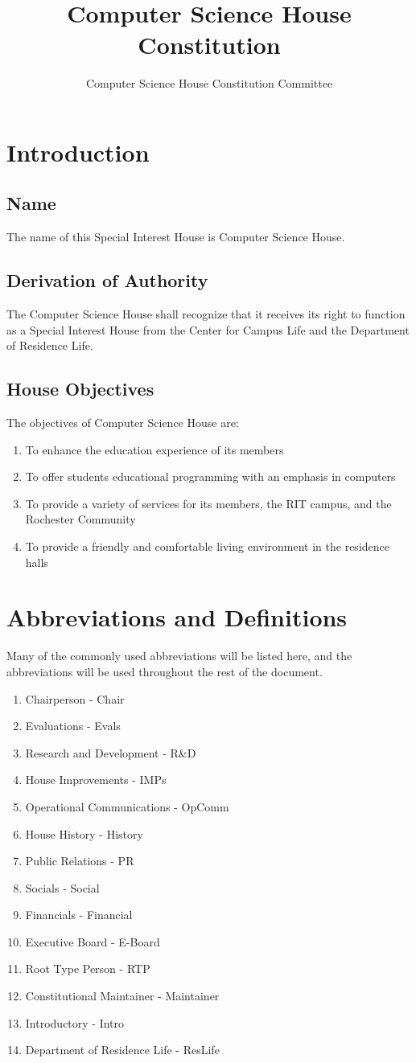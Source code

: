 \documentclass{article}
\title{Computer Science House Constitution}
\author{Computer Science House Constitution Committee}
\date{\datechanged}
\newcommand{\article}[1]{\section{#1} \label{#1}}
\newcommand{\asection}[1]{\subsection{#1} \label{#1}}
\begin{document}
\maketitle

\tableofcontents

\article{Introduction}

\asection{Name}
The name of this Special Interest House is Computer Science House.

\asection{Derivation of Authority}
The Computer Science House shall recognize that it receives its right to function as a Special Interest House from the Center for Campus Life and the Department of Residence Life.

\asection{House Objectives}
The objectives of Computer Science House are:
\begin{enumerate}
	\item To enhance the education experience of its members
	\item To offer students educational programming with an emphasis in computers
	\item To provide a variety of services for its members, the RIT campus, and the Rochester Community
	\item To provide a friendly and comfortable living environment in the residence halls
\end{enumerate}

\article{Abbreviations and Definitions}
Many of the commonly used abbreviations will be listed here, and the abbreviations will be used throughout the rest of the document.

\begin{enumerate}
	\item Chairperson - Chair
	\item Evaluations - Evals
	\item Research and Development - R\&D
	\item House Improvements - IMPs
	\item Operational Communications - OpComm
	\item House History - History
	\item Public Relations - PR
	\item Socials - Social
	\item Financials - Financial
	\item Executive Board - E-Board
	\item Root Type Person - RTP
	\item Constitutional Maintainer - Maintainer
	\item Introductory - Intro
	\item Department of Residence Life - ResLife
\end{enumerate}
\end{document}
